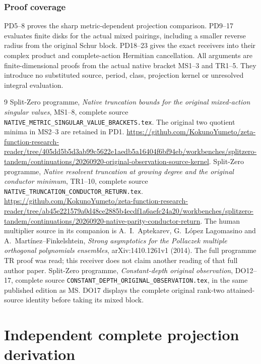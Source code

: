 \section{Proof coverage}
PD5--8 proves the sharp metric-dependent projection comparison.
PD9--17 evaluates finite disks for the actual mixed pairings,
including a smaller reverse radius from the original Schur block.
PD18--23 gives the exact receivers into their complex product and
complete-action Hermitian cancellation.  All arguments are
finite-dimensional proofs from the actual native bracket MS1--3
and TR1--5.  They introduce no substituted source, period, class,
projection kernel or unresolved integral evaluation.
\begin{thebibliography}{9}
 Split-Zero programme,
\emph{Native truncation bounds for the original mixed-action singular values},
MS1--8, complete source \texttt{NATIVE\_METRIC\_SINGULAR\_VALUE\_BRACKETS.tex}.
The original two quotient minima in MS2--3 are retained in PD1.
\url{https://github.com/KokunoYumeto/zeta-function-research-reader/tree/405dd5b5d3ab99c5622e1aedb5a16404f6bf94eb/workbenches/splitzero-tandem/continuations/20260920-original-observation-source-kernel}.
 Split-Zero programme,
\emph{Native resolvent truncation at growing degree and the original conductor minimum},
TR1--10, complete source \texttt{NATIVE\_TRUNCATION\_CONDUCTOR\_RETURN.tex}.
\url{https://github.com/KokunoYumeto/zeta-function-research-reader/tree/ab45e221579a0d48ce2885b4ecdf1a6aefc24a20/workbenches/splitzero-tandem/continuations/20260920-native-parity-conductor-return}.
The human multiplier source in its companion is A.~I.~Aptekarev,
G.~L\'opez Lagomasino and A.~Mart\'inez--Finkelshtein,
\emph{Strong asymptotics for the Pollaczek multiple orthogonal polynomials ensembles},
arXiv:1410.1261v1 (2014). The full programme TR proof was read;
this receiver does not claim another reading of that full author paper.
 Split-Zero programme,
\emph{Constant-depth original observation},
DO12--17, complete source \texttt{CONSTANT\_DEPTH\_ORIGINAL\_OBSERVATION.tex},
in the same published edition as MS. DO17 displays the complete original
rank-two attained-source identity before taking its mixed block.
\end{thebibliography}

\endgroup

\clearpage\begingroup
\part*{Independent complete projection derivation}
\newcommand{\mprindC}{\mathbb C}
\newcommand{\mprindim}{\operatorname{im}}
\newcommand{\mprinddiag}{\operatorname{diag}}
\newcommand{\mprindrank}{\operatorname{rank}}



